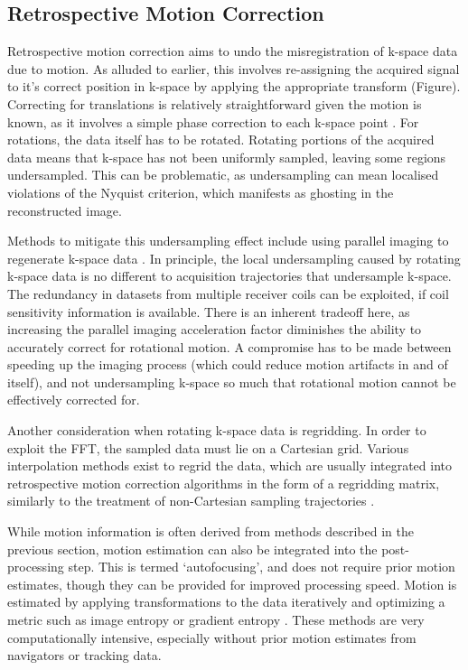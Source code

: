 \documentclass[class=article, crop=false]{standalone}
\begin{document}
\subsection{Retrospective Motion Correction}
Retrospective motion correction aims to undo the misregistration of k-space data due to motion. As alluded to earlier, this involves re-assigning the acquired signal to it's correct position in k-space by applying the appropriate transform (Figure). Correcting for translations is relatively straightforward given the motion is known, as it involves a simple phase correction to each k-space point \parencite{Ehman1989}. For rotations, the data itself has to be rotated. Rotating portions of the acquired data means that k-space has not been uniformly sampled, leaving some regions undersampled. This can be problematic, as undersampling can mean localised violations of the Nyquist criterion, which manifests as ghosting in the reconstructed image.  
\par
Methods to mitigate this undersampling effect include using parallel imaging to regenerate k-space data \parencite{Bydder2003,Larkman2004,Bammer2007}. In principle, the local undersampling caused by rotating k-space data is no different to acquisition trajectories that undersample k-space. The redundancy in datasets from multiple receiver coils can be exploited, if coil sensitivity information is available. There is an inherent tradeoff here, as increasing the parallel imaging acceleration factor diminishes the ability to accurately correct for rotational motion. A compromise has to be made between speeding up the imaging process (which could reduce motion artifacts in and of itself), and not undersampling k-space so much that rotational motion cannot be effectively corrected for.
\par
Another consideration when rotating k-space data is regridding. In order to exploit the FFT, the sampled data must lie on a Cartesian grid. Various interpolation methods exist to regrid the data, which are usually integrated into retrospective motion correction algorithms in the form of a regridding matrix, similarly to the treatment of non-Cartesian sampling trajectories \parencite{Atkinson2003,Jackson1991,Batchelor2005,Bammer2007}.
\par
While motion information is often derived from methods described in the previous section, motion estimation can also be integrated into the post-processing step. This is termed `autofocusing', and does not require prior motion estimates, though they can be provided for improved processing speed. Motion is estimated by applying transformations to the data iteratively and optimizing a metric such as image entropy \parencite{Atkinson1997,Atkinson1999,McGee2000} or gradient entropy \parencite{Loktyushin2013}. These methods are very computationally intensive, especially without prior motion estimates from navigators or tracking data.
\par
\end{document}
